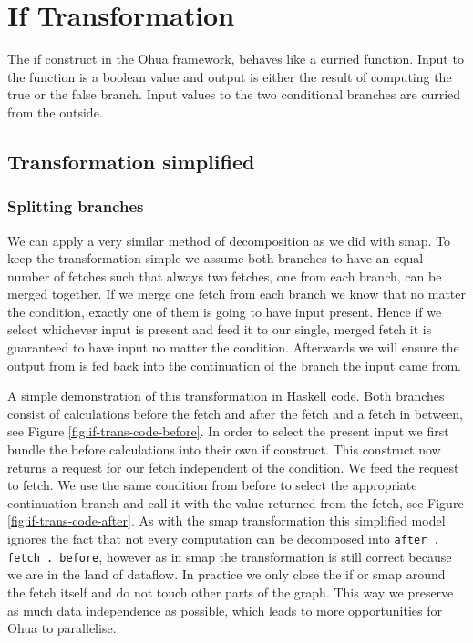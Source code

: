 \chapter{If Transformation}

\label{ch:if-transformation}

\newcommand{\opite}{\texttt{ifThenElse}}
\newcommand{\opselect}{\texttt{select}}

The if construct in the Ohua framework, behaves like a curried function.
Input to the function is a boolean value and output is either the result of computing the true or the false branch.
Input values to the two conditional branches are curried from the outside.

\section{Transformation simplified}


\subsection{Splitting branches}

We can apply a very similar method of decomposition as we did with smap.
To keep the transformation simple we assume both branches to have an equal number of fetches such that always two fetches, one from each branch, can be merged together.
If we merge one fetch from each branch we know that no matter the condition, exactly one of them is going to have input present.
Hence if we select whichever input is present and feed it to our single, merged fetch it is guaranteed to have input no matter the condition.
Afterwards we will ensure the output from \fetch{} is fed back into the continuation of the branch the input came from.

A simple demonstration of this transformation in Haskell code.
Both branches consist of calculations before the fetch and after the fetch and a fetch in between, see Figure \ref{fig:if-trans-code-before}.
In order to select the present input we first bundle the before calculations into their own if construct.
This construct now returns a request for our fetch independent of the condition.
We feed the request to fetch.
We use the same condition from before to select the appropriate continuation branch and call it with the value returned from the fetch, see Figure \ref{fig:if-trans-code-after}.
As with the smap transformation this simplified model ignores the fact that not every computation can be decomposed into \texttt{after . fetch . before}, however as in smap the transformation is still correct because we are in the land of dataflow.
In practice we only close the if or smap around the fetch itself and do not touch other parts of the graph.
This way we preserve as much data independence as possible, which leads to more opportunities for Ohua to parallelise.

